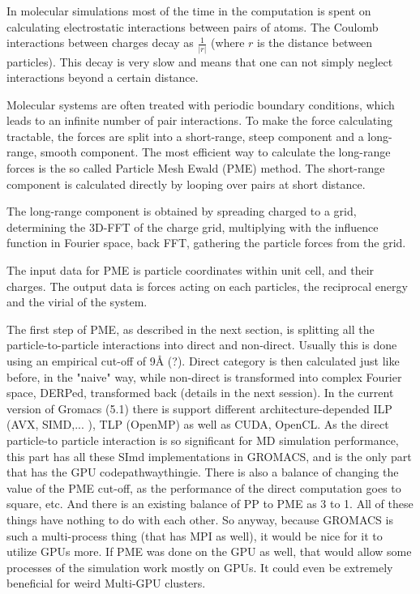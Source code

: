 \documentclass[12pt,a4paper]{report}
\begin{document}
In molecular simulations most of the time in the computation is spent on calculating electrostatic interactions between pairs of atoms. The Coulomb interactions between charges decay as $\frac{1}{\lvert r \rvert}$ (where $r$ is the distance between particles). This decay is very slow and means that one can not simply neglect interactions beyond a certain distance.

 Molecular systems are often treated with periodic boundary conditions, which leads to an infinite number of pair interactions. To make the force calculating tractable, the forces are split into a short-range, steep component and a long-range, smooth component. The most efficient way to calculate the long-range forces is the so called Particle Mesh Ewald (PME) method. The short-range component is calculated directly by looping over pairs at short distance. 
 
The long-range component is obtained by spreading charged to a grid, determining the 3D-FFT of the charge grid, multiplying with the influence function in Fourier space, back FFT, gathering the particle forces from the grid. 




The input data for PME is particle coordinates within unit cell, and their charges.  The output data is forces acting on each particles, the reciprocal energy and the virial of the system.

The first step of PME, as described in the next section, is splitting all the particle-to-particle interactions into direct and non-direct. Usually this is done using an empirical cut-off of 9Å (?). Direct category is then calculated just like before, in the "naive" way, while non-direct is transformed into complex Fourier space, DERPed, transformed back (details in the next session).
In the current version of Gromacs (5.1) there is support different architecture-depended ILP (AVX, SIMD,... ), TLP (OpenMP) as well as CUDA, OpenCL. As the direct particle-to particle interaction is so significant for MD simulation performance, this part has all these SImd implementations in GROMACS, and is the only part that has the GPU codepathwaythingie.
There is also a balance of changing the value of the PME cut-off, as the performance of the direct computation goes to square, etc. And there is an existing balance of PP to PME as 3 to 1. All of these things have nothing to do with each other.
So anyway, because GROMACS is such a multi-process thing (that has MPI as well), it would be nice for it to utilize GPUs more. If PME was done on the GPU as well, that would allow some processes of the simulation work mostly on GPUs. It could even be extremely beneficial for weird Multi-GPU clusters.
\fi
\end{document}

